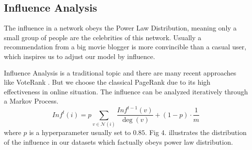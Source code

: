 \documentclass{article}
\begin{document}
\subsection{Influence Analysis}

The influence in a network obeys the Power Law Distribution, 
meaning only a small group of people are the celebrities of this network.
Usually a recommendation from a big movie blogger is more convincible than a casual user, 
which inspires us to adjust our model by influence.

Influence Analysis is a traditional topic and there are many recent approaches like VoteRank \cite{zhang2016voterank}.
But we choose the classical PageRank \cite{ser1998pagerank} due to its high effectiveness in online situation. 
The influence can be analyzed iteratively through a Markov Process.
\begin{equation}
   Inf^t(i) = p \sum_{v \in \mathcal{N}(i)} \frac{Inf^{t-1}(v)}{\deg(v)} + (1-p) \cdot \frac{1}{m}
\end{equation}
where $p$ is a hyperparameter usually set to $0.85$. 
Fig 4. illustrates the distribution of the influence in our datasets 
which factually obeys power law distribution.
\end{document}
